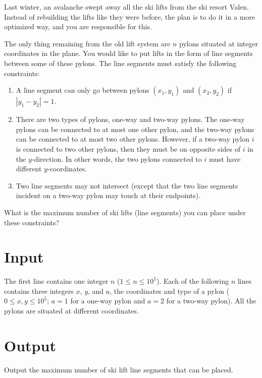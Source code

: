 
%
\noindent
Last winter, an avalanche swept away all the ski lifts from the ski resort Valen. 
Instead of rebuilding the lifts like they were before, the plan is to do it in a more optimized way, and you are responsible for this.

The only thing remaining from the old lift system are $n$ pylons situated at integer coordinates in the plane. 
You would like to put lifts in the form of line segments between some of these pylons. 
The line segments must satisfy the following constraints:

\begin{enumerate}

\item A line segment can only go between pylons $(x_1, y_1)$ and $(x_2, y_2)$ if $|y_1-y_2| = 1$.

\item There are two types of pylons, one-way and two-way pylons. 
The one-way pylons can be connected to at most one other pylon, and the two-way pylons can be connected to at most two other pylons. 
However, if a two-way pylon $i$ is connected to two other pylons, then they must be on opposite sides of $i$ in the $y$-direction. 
In other words, the two pylons connected to $i$ must have different $y$-coordinates.

\item Two line segments may not intersect (except that the two line
  segments incident on a two-way pylon may touch at their endpoints).

\end{enumerate}

\noindent
What is the maximum number of ski lifts (line segments) you can place under these constraints?

\section*{Input}
The first line contains one integer $n$ ($1 \leq n \leq 10^5$). 
Each of the following $n$ lines contains three integers $x$, $y$, and $a$, the coordinates and type of a pylon ($0 \leq x,y \leq 10^5$; $a=1$ for a one-way pylon and $a=2$ for a two-way pylon).
All the pylons are situated at different coordinates.

\section*{Output}
Output the maximum number of ski lift line segments that can be placed.
